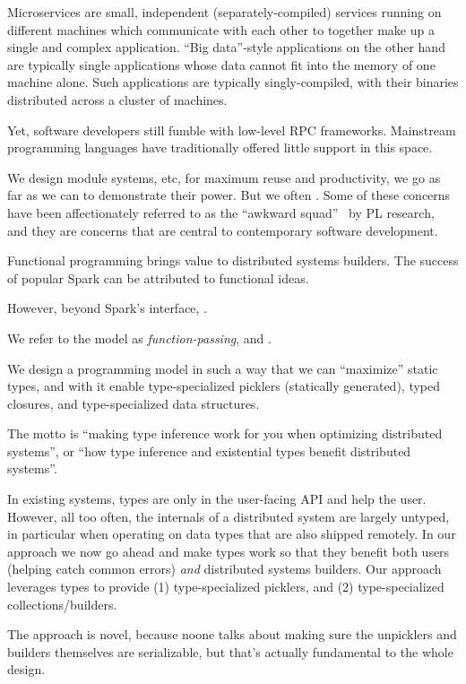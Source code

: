 \documentclass{sigplanconf}
\theoremstyle{definition}
\theoremstyle{definition}
\begin{document}
Microservices are small, independent (separately-compiled) services running on
different machines which communicate with each other to together make up a
single and complex application. ``Big data''-style applications on the other
hand are typically single applications whose data cannot fit into the memory
of one machine alone. Such applications are typically singly-compiled, with
their binaries distributed across a cluster of machines.

Yet, software developers still fumble with low-level RPC frameworks.
Mainstream programming languages have traditionally offered little support in
this space.

We design module systems, etc, for maximum reuse and productivity, we go as
far as we can to demonstrate their power. But we often . Some of these
concerns have been affectionately referred to as the ``awkward
squad''~\cite{AwkwardSquad} by PL research, and they are concerns that are central to
contemporary software development.

Functional programming brings value to distributed systems builders. The
success of popular Spark can be attributed to functional ideas.

However, beyond Spark's interface, .

We refer to the model as {\em function-passing}, and .


We design a programming model in such a way that we can ``maximize'' static
types, and with it enable type-specialized picklers (statically generated),
typed closures, and type-specialized data structures.

The motto is ``making type inference work for you when optimizing distributed
systems'', or ``how type inference and existential types benefit distributed
systems''.

In existing systems, types are only in the user-facing API and help the user.
However, all too often, the internals of a distributed system are largely
untyped, in particular when operating on data types that are also shipped
remotely. In our approach we now go ahead and make types work so that they
benefit both users (helping catch common errors) \emph{and} distributed
systems builders. Our approach leverages types to provide (1) type-specialized
picklers, and (2) type-specialized collections/builders.

The approach is novel, because noone talks about making sure the unpicklers
and builders themselves are serializable, but that's actually fundamental to
the whole design.
\end{document}
